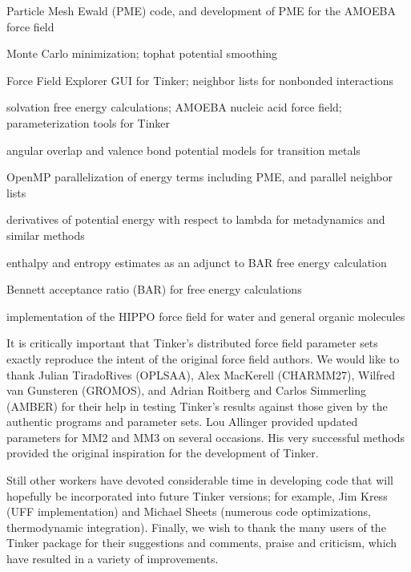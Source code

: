 \documentclass[letterpaper,11pt,english]{sphinxmanual}
\begin{document}

Particle Mesh Ewald (PME) code, and development of PME for the AMOEBA force field


Monte Carlo minimization; tophat potential smoothing


Force Field Explorer GUI for Tinker; neighbor lists for nonbonded interactions


solvation free energy calculations; AMOEBA nucleic acid force field; parameterization tools for Tinker


angular overlap and valence bond potential models for transition metals


OpenMP parallelization of energy terms including PME, and parallel neighbor lists


derivatives of potential energy with respect to lambda for metadynamics and similar methods


enthalpy and entropy estimates as an adjunct to BAR free energy calculation


Bennett acceptance ratio (BAR) for free energy calculations


implementation of the HIPPO force field for water and general organic molecules

It is critically important that Tinker’s distributed force field parameter sets exactly reproduce the intent of the original force field authors. We would like to thank Julian Tirado\sphinxhyphen{}Rives (OPLS\sphinxhyphen{}AA), Alex MacKerell (CHARMM27), Wilfred van Gunsteren (GROMOS), and Adrian Roitberg and Carlos Simmerling (AMBER) for their help in testing Tinker’s results against those given by the authentic programs and parameter sets. Lou Allinger provided updated parameters for MM2 and MM3 on several occasions. His very successful methods provided the original inspiration for the development of Tinker.

Still other workers have devoted considerable time in developing code that will hopefully be incorporated into future Tinker versions; for example, Jim Kress (UFF implementation) and Michael Sheets (numerous code optimizations, thermodynamic integration). Finally, we wish to thank the many users of the Tinker package for their suggestions and comments, praise and criticism, which have resulted in a variety of improvements.
\end{document}

